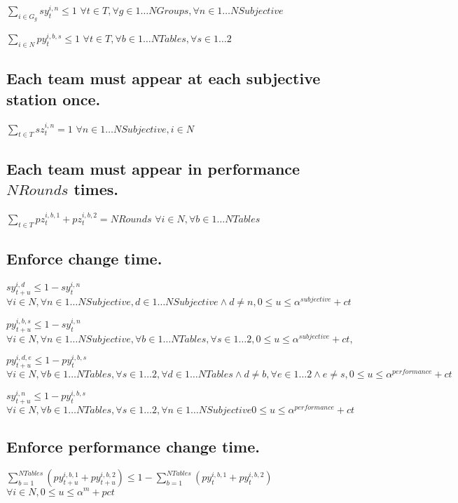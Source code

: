 \documentclass[letterpaper,11pt]{report}
\begin{document}
$\sum\limits_{i \in G_{g}} sy_{t}^{i,n} \le 1$          
\hfill $\forall t \in T, \forall g \in 1 \dots NGroups,
\forall n \in 1 \dots NSubjective$

$\sum\limits_{i \in N} py_{t}^{i,b,s} \le 1$          
\hfill $\forall t \in T, \forall b \in 1 \dots NTables,
\forall s \in 1 \dots 2$


\subsection{Each team must appear at each subjective station once.}
$\sum\limits_{t \in T} sz_{t}^{i,n} = 1$
\hfill $\forall n \in 1 \dots NSubjective, i \in N$

\subsection{Each team must appear in performance $NRounds$ times.}
$\sum\limits_{t \in T} pz_{t}^{i,b,1} + pz_{t}^{i,b,2} = NRounds$
\hfill $\forall i \in N, \forall b \in 1 \dots NTables$


\subsection{Enforce change time.}
$sy_{t+u}^{i,d} \le 1 - sy_{t}^{i,n}$
\hfill $\forall i \in N,
\forall n \in 1 \dots NSubjective, 
d \in 1 \dots NSubjective \wedge d \neq n,
0 \le u \le \alpha^{subjective} + ct$

$py_{t+u}^{i,b,s} \le 1 - sy_{t}^{i,n}$
\hfill $\forall i \in N,
\forall n \in 1 \dots NSubjective, 
\forall b \in 1 \dots NTables,
\forall s \in 1 \dots 2,
0 \le u \le \alpha^{subjective}+ ct,$

$py_{t+u}^{i,d,e} \le 1 - py_{t}^{i,b,s}$
\hfill $\forall i \in N,
\forall b \in 1 \dots NTables,
\forall s \in 1 \dots 2,
\forall d \in 1 \dots NTables \wedge d \neq b,
\forall e \in 1 \dots 2 \wedge e \neq s,
0 \le u \le \alpha^{performance}+ ct$

$sy_{t+u}^{i,n} \le 1 - py_{t}^{i,b,s}$
\hfill $\forall i \in N,
\forall b \in 1 \dots NTables,
\forall s \in 1 \dots 2,
\forall n \in 1 \dots NSubjective
0 \le u \le \alpha^{performance}+ ct$


\subsection{Enforce performance change time.}
$\sum\limits_{b=1}^{NTables} (py_{t+u}^{i,b,1} + py_{t+u}^{i,b,2}) \le 1 - \sum\limits_{b=1}^{NTables} (py_{t}^{i,b,1} + py_{t}^{i,b,2})$
\hfill $\forall i \in N, 
0 \le u \le \alpha^{m} + pct$
\end{document}
